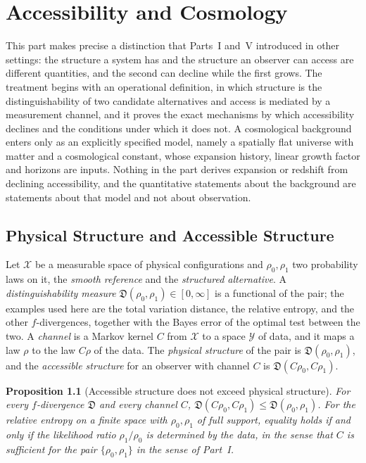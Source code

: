 \documentclass[11pt,oneside]{book}
\newtheorem{proposition}[theorem]{Proposition}
\theoremstyle{definition}
\theoremstyle{remark}
\begin{document}
\part{Accessibility and Cosmology}

This part makes precise a distinction that Parts~I and~V introduced in other settings: the structure a system has and the structure an observer can access are different quantities, and the second can decline while the first grows. The treatment begins with an operational definition, in which structure is the distinguishability of two candidate alternatives and access is mediated by a measurement channel, and it proves the exact mechanisms by which accessibility declines and the conditions under which it does not. A cosmological background enters only as an explicitly specified model, namely a spatially flat universe with matter and a cosmological constant, whose expansion history, linear growth factor and horizons are inputs. Nothing in the part derives expansion or redshift from declining accessibility, and the quantitative statements about the background are statements about that model and not about observation.

\chapter{Physical Structure and Accessible Structure}\label{ch:access}

Let $\mathcal X$ be a measurable space of physical configurations and $\rho_0,\rho_1$ two probability laws on it, the \emph{smooth reference} and the \emph{structured alternative}. A \emph{distinguishability measure} $\mathfrak D(\rho_0,\rho_1)\in[0,\infty]$ is a functional of the pair; the examples used here are the total variation distance, the relative entropy, and the other $f$-divergences, together with the Bayes error of the optimal test between the two. A \emph{channel} is a Markov kernel $C$ from $\mathcal X$ to a space $\mathcal Y$ of data, and it maps a law $\rho$ to the law $C\rho$ of the data. The \emph{physical structure} of the pair is $\mathfrak D(\rho_0,\rho_1)$, and the \emph{accessible structure} for an observer with channel $C$ is $\mathfrak D(C\rho_0,C\rho_1)$.

\begin{proposition}[Accessible structure does not exceed physical structure]\label{prop:access-dpi}
For every $f$-divergence $\mathfrak D$ and every channel $C$, $\mathfrak D(C\rho_0,C\rho_1)\leq\mathfrak D(\rho_0,\rho_1)$. For the relative entropy on a finite space with $\rho_0,\rho_1$ of full support, equality holds if and only if the likelihood ratio $\rho_1/\rho_0$ is determined by the data, in the sense that $C$ is sufficient for the pair $\{\rho_0,\rho_1\}$ in the sense of Part~I.
\end{proposition}
\end{document}
